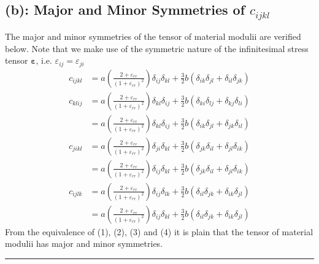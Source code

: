 \subsection*{(b): Major and Minor Symmetries of $c_{ijkl}$}
The major and minor symmetries of the tensor of material modulii are verified below. Note that we make use of the symmetric nature of the infinitesimal stress tensor $\bm\varepsilon$, i.e. $\varepsilon_{ij} = \varepsilon_{ji}$
\begin{align}
c_{ijkl}
& = 
a\left(
\frac{2+\varepsilon_{rr}}{(1+\varepsilon_{rr})^2}
\right)\delta_{ij}\delta_{kl}
+\frac{3}{2}b(\delta_{ik}\delta_{jl}+\delta_{il}\delta_{jk})\\
\nonumber c_{klij}
& = 
a\left(
\frac{2+\varepsilon_{rr}}{(1+\varepsilon_{rr})^2}
\right)\delta_{kl}\delta_{ij}
+\frac{3}{2}b(\delta_{ki}\delta_{lj}+\delta_{kj}\delta_{li})\\
& =
a\left(
\frac{2+\varepsilon_{rr}}{(1+\varepsilon_{rr})^2}
\right)\delta_{kl}\delta_{ij}
+\frac{3}{2}b(\delta_{ik}\delta_{jl}+\delta_{jk}\delta_{il})\\
\nonumber c_{jikl}
& = 
a\left(
\frac{2+\varepsilon_{rr}}{(1+\varepsilon_{rr})^2}
\right)\delta_{ji}\delta_{kl}
+\frac{3}{2}b(\delta_{jk}\delta_{il}+\delta_{jl}\delta_{ik})\\
\nonumber & = 
a\left(
\frac{2+\varepsilon_{rr}}{(1+\varepsilon_{rr})^2}
\right)\delta_{ij}\delta_{kl}
+\frac{3}{2}b(\delta_{jk}\delta_{il}+\delta_{jl}\delta_{ik})\\
\nonumber c_{ijlk}& = 
a\left(
\frac{2+\varepsilon_{rr}}{(1+\varepsilon_{rr})^2}
\right)\delta_{ij}\delta_{lk}
+\frac{3}{2}b(\delta_{il}\delta_{jk}+\delta_{ik}\delta_{jl})\\
& = 
a\left(
\frac{2+\varepsilon_{rr}}{(1+\varepsilon_{rr})^2}
\right)\delta_{ij}\delta_{kl}
+\frac{3}{2}b(\delta_{il}\delta_{jk}+\delta_{ik}\delta_{jl})
\end{align}
From the equivalence of (1), (2), (3) and (4) it is plain that the tensor of material modulii has major and minor symmetries. \\ \hrule
